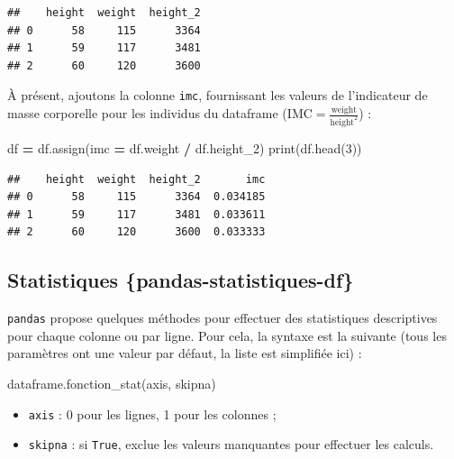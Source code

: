 \documentclass[12pt,]{book}
\newenvironment{Shaded}{\begin{snugshade}}{\end{snugshade}}
\newcommand{\DecValTok}[1]{\textcolor[rgb]{0.00,0.00,0.81}{#1}}
\newcommand{\OperatorTok}[1]{\textcolor[rgb]{0.81,0.36,0.00}{\textbf{#1}}}
\newcommand{\BuiltInTok}[1]{#1}
\newcommand{\NormalTok}[1]{#1}
\providecommand{\tightlist}{%
  \setlength{\itemsep}{0pt}\setlength{\parskip}{0pt}}
\numberwithin{equation}{section}
\numberwithin{countremarque}{section}
\begin{document}
\begin{lstlisting}
##    height  weight  height_2
## 0      58     115      3364
## 1      59     117      3481
## 2      60     120      3600
\end{lstlisting}

À présent, ajoutons la colonne \texttt{imc}, fournissant les valeurs de
l'indicateur de masse corporelle pour les individus du dataframe
(\(\text{IMC} = \frac{\text{weight}}{\text{height}^2}\)) :

\begin{Shaded}
\begin{Highlighting}[]
\NormalTok{df }\OperatorTok{=}\NormalTok{ df.assign(imc }\OperatorTok{=}\NormalTok{ df.weight }\OperatorTok{/}\NormalTok{ df.height_2)}
\BuiltInTok{print}\NormalTok{(df.head(}\DecValTok{3}\NormalTok{))}
\end{Highlighting}
\end{Shaded}

\begin{lstlisting}
##    height  weight  height_2       imc
## 0      58     115      3364  0.034185
## 1      59     117      3481  0.033611
## 2      60     120      3600  0.033333
\end{lstlisting}

\subsection{Statistiques
\{pandas-statistiques-df\}}\label{statistiques-pandas-statistiques-df}

\texttt{pandas} propose quelques méthodes pour effectuer des
statistiques descriptives pour chaque colonne ou par ligne. Pour cela,
la syntaxe est la suivante (tous les paramètres ont une valeur par
défaut, la liste est simplifiée ici) :

\begin{Shaded}
\begin{Highlighting}[]
\NormalTok{dataframe.fonction_stat(axis, skipna)}
\end{Highlighting}
\end{Shaded}

\begin{itemize}
\tightlist
\item
  \texttt{axis} : 0 pour les lignes, 1 pour les colonnes ;
\item
  \texttt{skipna} : si \texttt{True}, exclue les valeurs manquantes pour
  effectuer les calculs.
\end{itemize}
\end{document}
